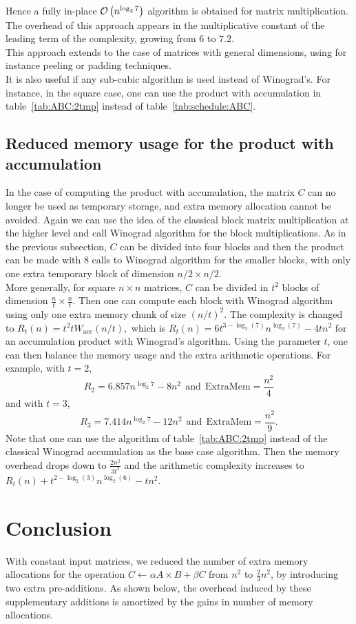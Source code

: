 \documentclass{article}
\begin{document}
Hence a fully in-place $\mathcal{O}\left(n^{\log_2 7}\right)$ algorithm is obtained for matrix
multiplication.
The overhead of this approach appears in the multiplicative constant of
the leading term of the complexity, growing from $6$ to $7.2$.\\
This approach extends to the case of matrices with general
dimensions, using for instance peeling or padding techniques.\\
It is also useful if any sub-cubic algorithm is used
instead of Winograd's. For instance, in the square case, one can use the product with accumulation in table~\ref{tab:ABC:2tmp} instead of table~\ref{tab:schedule:ABC}.
\subsection{Reduced memory usage for the product with accumulation}\label{sec:red}
In the case of computing the product with accumulation, the matrix $C$ can no longer be used as temporary storage, and
extra memory allocation cannot be avoided.
Again we can use the idea of the classical block matrix multiplication at the
higher level and call Winograd algorithm for the block multiplications.
As in the previous subsection, $C$ can be divided into
four blocks and then the product can be made with 8 calls to Winograd algorithm for
the smaller blocks, with only one extra temporary block of  dimension $n/2
\times n/2$.\\
More generally, for square $n \times n$ matrices,
$C$ can be divided in $t^2$ blocks of dimension $ \frac{n}{t} \times
\frac{n}{t}$.
Then one can compute each block with Winograd algorithm using only
one extra memory chunk of size $(n/t)^2$. The complexity is changed to
$R_t(n) = t^2 t W_\text{acc}(n/t),$ which is
$R_t(n) = 6t^{3-\log_2(7)}n^{\log_2(7)}-4tn^2$
for an accumulation product with
Winograd's algorithm.
Using the parameter $t$, one can then balance the memory usage
and the extra arithmetic operations. For example, with $t=2$,
$$R_2 = 6.857n^{\log_2 7}-8n^2~~\text{and}~~\text{ExtraMem}=\frac{n^2}{4}$$ and
with $t=3$,
$$R_3 = 7.414n^{\log_2 7}-12n^2~~\text{and}~~\text{ExtraMem}=\frac{n^2}{9}.$$
Note that one can use the algorithm of table~\ref{tab:ABC:2tmp} instead of
the classical Winograd accumulation as the base case algorithm.
Then the memory overhead drops down to $\frac{2n^2}{3t^2}$ and the
arithmetic complexity increases to
$R_t(n)+t^{2-\log_2(3)}n^{\log_2(6)}-tn^2$.
\section{Conclusion}
With constant input matrices, we reduced the number of extra memory
allocations for the operation $C\leftarrow \alpha A\times B +\beta C$
from $n^2$ to $\frac{2}{3} n^2$,
by introducing two extra pre-additions. As shown below, the
overhead induced by these supplementary additions is amortized by
the gains in number of memory allocations.
\end{document}
